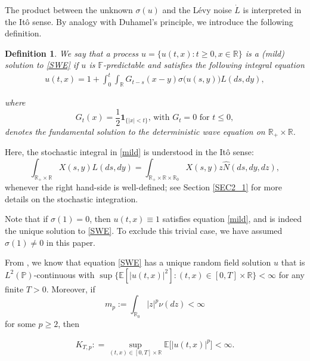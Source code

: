 \documentclass[letterpaper, 11pt,  reqno]{amsart}
\newtheorem{definition}[theorem]{Definition}
\newcommand{\noi}{\noindent}
\newcommand{\R}{\mathbb{R}}
\newcommand{\bR}{\mathbb{R}}
\newcommand{\E}{\mathbb{E}}
\newcommand{\s}{\sigma}
\newcommand{\ind}{\mathbf 1}
\newcommand{\PP}{\mathbb{P}}
\numberwithin{equation}{section}
\numberwithin{theorem}{section}
\begin{document}
The product between the unknown $\s(u)$ and the L\'evy noise $\dot{L}$ is interpreted in the It\^o sense. By analogy with Duhamel's principle, we introduce the following definition. 

\begin{definition}
 We say that a process $u=\{u(t,x):t\geq 0,x \in \bR\}$ is a  {\rm(}mild{\rm)} solution to   \eqref{SWE} if $u$ is $\mathbb{F}$-predictable 
and satisfies the following integral equation
\begin{align}\label{mild}
u(t,x) = 1 + \int_0^t \int_\R G_{t-s}(x-y) \s\big( u(s,y) \big)  L(ds, dy),
\end{align}

\noi
where
\begin{equation}
\label{def-G}
G_t(x)= \frac{1}{2}\ind_{\{ |x|< t\}} , \, \text{with $G_t = 0$ for $t\leq 0$},
\end{equation} 
denotes  the fundamental solution to the deterministic wave equation on $\bR_{+} \times \bR$.
\end{definition}


Here,  the stochastic integral in \eqref{mild} is understood in the It\^o sense:
\[
\int_{\R_{+}\times\R} X(s, y) L(ds, dy) 
= \int_{\R_{+}\times\R\times\R_0} X(s, y)z \widehat{N}(ds, dy, dz),
\]
whenever  the right hand-side is well-defined; see 
Section \ref{SEC2_1} for 
more details on the stochastic integration. 




\smallskip

Note that if $\s(1) = 0$, then  $u(t, x) \equiv 1$ satisfies equation \eqref{mild},
and is indeed the unique solution to \eqref{SWE}. To exclude this trivial case,
we have assumed    $\s(1) \neq 0$ in this paper. 

\smallskip


From \cite[Theorem 1.1]{BN16}, we know that equation \eqref{SWE} has
a unique random field solution $u$ that is $L^2(\PP)$-continuous 
 with
$
\sup\big\{ \E [ | u(t,x)|^2  ]:  (t,x)\in [0,T]\times\R\} <\infty
$
 for any  finite $T > 0$. 
 Moreover, if 
\begin{equation}
\label{mp}
m_p := \int_{\R_0} |z|^p \nu(dz) <\infty 
\end{equation}
for some $p\geq 2$, then

\noi
\begin{align} \label{KTP}
K_{T, p} : = \sup_{(t,x)\in [0,T] \times \bR} \E\big[ | u(t,x) |^p \big] <\infty.
\end{align}
\end{document}

